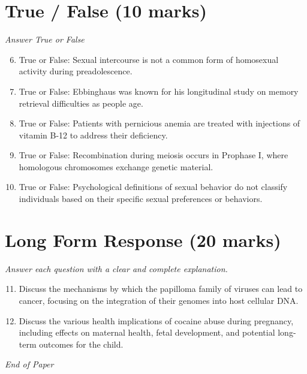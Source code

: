 \documentclass[12pt]{article}
\begin{document}
\section*{True / False (10 marks)}
\textit{Answer True or False}
\begin{enumerate}[label=\arabic*.]
\setcounter{enumi}{5}
\item True or False: Sexual intercourse is not a common form of homosexual activity during preadolescence.
\item True or False: Ebbinghaus was known for his longitudinal study on memory retrieval difficulties as people age.
\item True or False: Patients with pernicious anemia are treated with injections of vitamin B-12 to address their deficiency.
\item True or False: Recombination during meiosis occurs in Prophase I, where homologous chromosomes exchange genetic material.
\item True or False: Psychological definitions of sexual behavior do not classify individuals based on their specific sexual preferences or behaviors.
\end{enumerate}

\section*{Long Form Response (20 marks)}
\textit{Answer each question with a clear and complete explanation.}
\begin{enumerate}[label=\arabic*.]
\setcounter{enumi}{10}
\item Discuss the mechanisms by which the papilloma family of viruses can lead to cancer, focusing on the integration of their genomes into host cellular DNA.
\item Discuss the various health implications of cocaine abuse during pregnancy, including effects on maternal health, fetal development, and potential long-term outcomes for the child.
\end{enumerate}

\vfill
\noindent\textit{End of Paper}
\end{document}
